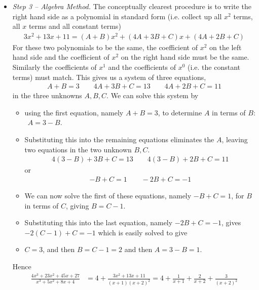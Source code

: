 \begin{eg}
\begin{itemize}
\item \emph{Step 3 -- Algebra Method.}
The conceptually clearest procedure is to write the right hand side as
a polynomial in standard form (i.e. collect up all $x^2$ terms, all $x$
terms and all constant terms)
\begin{align*}
3x^2+13x+11=(A+B)x^2 + (4A+3B+C)x +(4A+2B+C)
\end{align*}
For these two polynomials to be the same, the coefficient of $x^2$ on the
left hand side and the coefficient of $x^2$ on the right hand side must
be the same. Similarly the coefficients of $x^1$ and the coefficients of
$x^0$ (i.e. the constant terms) must match. This gives us a system of three
equations,
\begin{align*}
A+B=3\qquad 4A+3B+C=13\qquad 4A+2B+C=11
\end{align*}
in the three unknowns $A,B,C$. We can solve this system by
\begin{itemize}
\item using the first equation, namely $A+B=3$, to determine $A$ in
terms of $B$: $\ \ A=3-B$.
\item
Substituting this into the remaining equations eliminates the $A$,
leaving two equations in the two unknown $B,C$.
\begin{align*}
4(3-B)+3B+C=13\qquad 4(3-B)+2B+C=11
\end{align*}
or
\begin{align*}
-B+C=1\qquad -2B+C=-1
\end{align*}
\item
We can now solve the first of these equations, namely $-B+C=1$, for
$B$ in terms of $C$, giving $B=C-1$.
\item
Substituting this into the last equation,
namely $-2B+C=-1$, gives $-2(C-1)+C=-1$ which is easily solved to give
\item
$C=3$, and then $B=C-1=2$ and then $A=3-B=1$.
\end{itemize}
Hence
\begin{align*}
\frac{4x^3+23x^2+45x+27}{x^3+5x^2+8x+4}
&= 4+ \frac{3x^2+13x+11}{(x+1)(x+2)^2}
= 4+\frac{1}{x+1}+\frac{2}{x+2}+\frac{3}{(x+2)^2}
\end{align*}


\end{itemize}
\end{eg}
